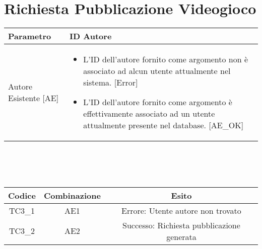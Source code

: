 \section{Richiesta Pubblicazione Videogioco}
\begin{tabular}{|| l | p{25em} ||} 
	\hline
	Parametro & ID Autore\\
	\hline
	Autore Esistente [AE] & \begin{itemize}
	\item L'ID dell'autore fornito come argomento non è associato ad alcun utente attualmente nel sistema. [Error]
	\item L'ID dell'autore fornito come argomento è effettivamente associato ad un utente attualmente presente nel database. [AE\_OK]
	\end{itemize}\\
	\hline
\end{tabular}
\\\\\\
\begin{tabular}{|| c | c | c ||}
	\hline
	Codice & Combinazione & Esito\\
	\hline
	TC3\_1 & AE1 & Errore: Utente autore non trovato \\
	\hline
	TC3\_2 & AE2 & Successo: Richiesta pubblicazione generata \\
	\hline
\end{tabular}
